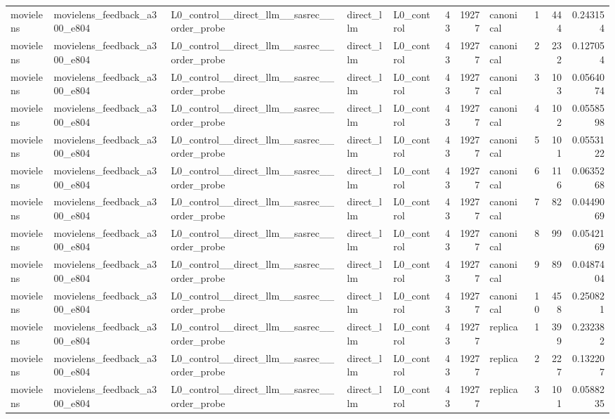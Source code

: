 \begin{table}[htbp!]
\begin{tabular}{lllllrrlrrr}
movielens & movielens\_feedback\_a300\_e804 & L0\_control\_\_direct\_llm\_\_sasrec\_\_order\_probe & direct\_llm & L0\_control & 43 & 19277 & canonical & 1 & 444 & 0.243154 \\
movielens & movielens\_feedback\_a300\_e804 & L0\_control\_\_direct\_llm\_\_sasrec\_\_order\_probe & direct\_llm & L0\_control & 43 & 19277 & canonical & 2 & 232 & 0.127054 \\
movielens & movielens\_feedback\_a300\_e804 & L0\_control\_\_direct\_llm\_\_sasrec\_\_order\_probe & direct\_llm & L0\_control & 43 & 19277 & canonical & 3 & 103 & 0.0564074 \\
movielens & movielens\_feedback\_a300\_e804 & L0\_control\_\_direct\_llm\_\_sasrec\_\_order\_probe & direct\_llm & L0\_control & 43 & 19277 & canonical & 4 & 102 & 0.0558598 \\
movielens & movielens\_feedback\_a300\_e804 & L0\_control\_\_direct\_llm\_\_sasrec\_\_order\_probe & direct\_llm & L0\_control & 43 & 19277 & canonical & 5 & 101 & 0.0553122 \\
movielens & movielens\_feedback\_a300\_e804 & L0\_control\_\_direct\_llm\_\_sasrec\_\_order\_probe & direct\_llm & L0\_control & 43 & 19277 & canonical & 6 & 116 & 0.0635268 \\
movielens & movielens\_feedback\_a300\_e804 & L0\_control\_\_direct\_llm\_\_sasrec\_\_order\_probe & direct\_llm & L0\_control & 43 & 19277 & canonical & 7 & 82 & 0.0449069 \\
movielens & movielens\_feedback\_a300\_e804 & L0\_control\_\_direct\_llm\_\_sasrec\_\_order\_probe & direct\_llm & L0\_control & 43 & 19277 & canonical & 8 & 99 & 0.0542169 \\
movielens & movielens\_feedback\_a300\_e804 & L0\_control\_\_direct\_llm\_\_sasrec\_\_order\_probe & direct\_llm & L0\_control & 43 & 19277 & canonical & 9 & 89 & 0.0487404 \\
movielens & movielens\_feedback\_a300\_e804 & L0\_control\_\_direct\_llm\_\_sasrec\_\_order\_probe & direct\_llm & L0\_control & 43 & 19277 & canonical & 10 & 458 & 0.250821 \\
movielens & movielens\_feedback\_a300\_e804 & L0\_control\_\_direct\_llm\_\_sasrec\_\_order\_probe & direct\_llm & L0\_control & 43 & 19277 & replica & 1 & 399 & 0.232382 \\
movielens & movielens\_feedback\_a300\_e804 & L0\_control\_\_direct\_llm\_\_sasrec\_\_order\_probe & direct\_llm & L0\_control & 43 & 19277 & replica & 2 & 227 & 0.132207 \\
movielens & movielens\_feedback\_a300\_e804 & L0\_control\_\_direct\_llm\_\_sasrec\_\_order\_probe & direct\_llm & L0\_control & 43 & 19277 & replica & 3 & 101 & 0.0588235 \\

\end{tabular}
\end{table}
